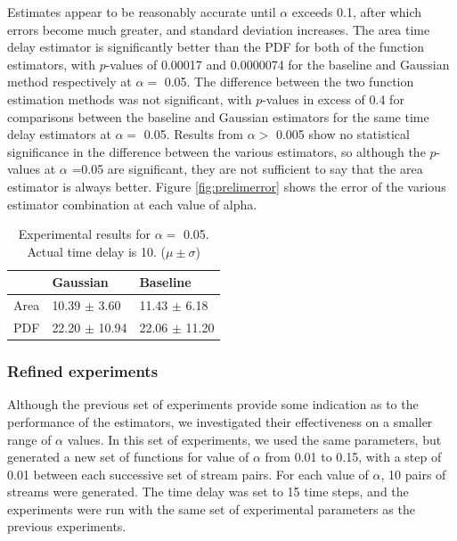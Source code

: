 \documentclass[a4paper,11pt]{article}
\begin{document}
Estimates appear to be reasonably accurate until $\alpha$ exceeds 0.1, after
which errors become much greater, and standard deviation increases. The area
time delay estimator is significantly better than the PDF for both of the
function estimators, with $p$-values of 0.00017 and 0.0000074 for the baseline
and Gaussian method respectively at $\alpha=$ 0.05. The difference between the
two function estimation methods was not significant, with $p$-values in excess
of 0.4 for comparisons between the baseline and Gaussian estimators for the same
time delay estimators at $\alpha=$ 0.05. Results from $\alpha>$ 0.005 show no
statistical significance in the difference between the various estimators, so
although the $p$-values at $\alpha$ =0.05 are significant, they are not
sufficient to say that the area estimator is always better. Figure
\ref{fig:prelimerror} shows the error of the various estimator combination at
each value of alpha.
\begin{table}[htb]

\begin{center}
\begin{tabular}{l|ll}
       &  Gaussian           &  Baseline           \\
\hline
 Area  &  10.39 $\pm$ 3.60   &  11.43 $\pm$ 6.18   \\
 PDF   &  22.20 $\pm$ 10.94  &  22.06 $\pm$ 11.20  \\
\end{tabular}
\end{center}
\caption{Experimental results for $\alpha=$ 0.05. Actual time delay is 10. ($\mu\pm\sigma$)} \label{fig:pretab}\end{table}
\subsubsection{Refined experiments}
\label{sec-7-1-2}

Although the previous set of experiments provide some indication as to the
performance of the estimators, we investigated their effectiveness on a smaller
range of $\alpha$ values. In this set of experiments, we used the same
parameters, but generated a new set of functions for value of $\alpha$ from
0.01 to 0.15, with a step of 0.01 between each successive set of stream
pairs. For each value of $\alpha$, 10 pairs of streams were generated. The time
delay was set to 15 time steps, and the experiments were run with the same set
of experimental parameters as the previous experiments.
\end{document}
